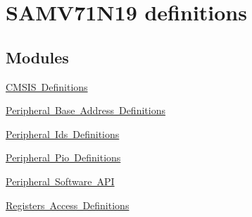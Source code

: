 \hypertarget{group__SAMV71N19__definitions}{}\section{S\+A\+M\+V71\+N19 definitions}
\label{group__SAMV71N19__definitions}
\subsection*{Modules}
\begin{DoxyCompactItemize}
\item 
\mbox{\hyperlink{group__SAMV71N19__cmsis}{C\+M\+S\+I\+S Definitions}}
\item 
\mbox{\hyperlink{group__SAMV71N19__base}{Peripheral Base Address Definitions}}
\item 
\mbox{\hyperlink{group__SAMV71N19__id}{Peripheral Ids Definitions}}
\item 
\mbox{\hyperlink{group__SAMV71N19__pio}{Peripheral Pio Definitions}}
\item 
\mbox{\hyperlink{group__SAMV71N19__api}{Peripheral Software A\+PI}}
\item 
\mbox{\hyperlink{group__SAMV71N19__reg}{Registers Access Definitions}}
\end{DoxyCompactItemize}
